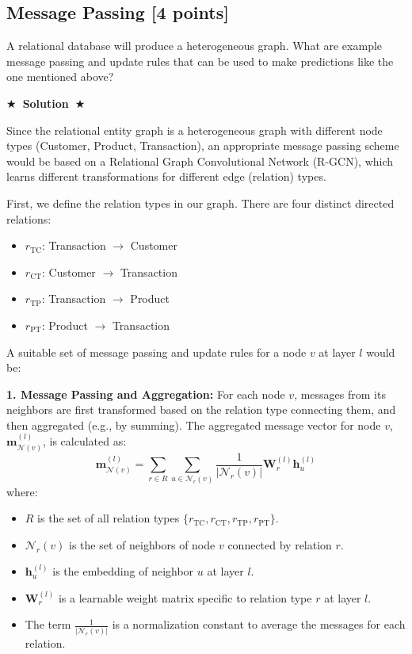 \documentclass{article}
\numberwithin{figure}{section}
\newcommand{\Solution}[1]{%
    {%
        \medskip
        \color{red}
        \bf $\bigstar$~\sf\textbf{Solution}~$\bigstar$ \sf
        #1
    }
    \bigskip
}
\begin{document}
\subsection{Message Passing [4 points]}
 A relational database will produce a heterogeneous graph. What are example message passing and update rules that can be used to make predictions like the one mentioned above?

\Solution{
	Since the relational entity graph is a heterogeneous graph with different node types (Customer, Product, Transaction), an appropriate message passing scheme would be based on a Relational Graph Convolutional Network (R-GCN), which learns different transformations for different edge (relation) types.
	
	First, we define the relation types in our graph. There are four distinct directed relations:
	\begin{itemize}
		\item $r_{\text{TC}}$: Transaction $\rightarrow$ Customer
		\item $r_{\text{CT}}$: Customer $\rightarrow$ Transaction
		\item $r_{\text{TP}}$: Transaction $\rightarrow$ Product
		\item $r_{\text{PT}}$: Product $\rightarrow$ Transaction
	\end{itemize}
	
	A suitable set of message passing and update rules for a node $v$ at layer $l$ would be:
	
	\textbf{1. Message Passing and Aggregation:}
	For each node $v$, messages from its neighbors are first transformed based on the relation type connecting them, and then aggregated (e.g., by summing). The aggregated message vector for node $v$, $\mathbf{m}_{\mathcal{N}(v)}^{(l)}$, is calculated as:
	\[ \mathbf{m}_{\mathcal{N}(v)}^{(l)} = \sum_{r \in R} \sum_{u \in \mathcal{N}_r(v)} \frac{1}{|\mathcal{N}_r(v)|} \mathbf{W}_r^{(l)} \mathbf{h}_u^{(l)} \]
	where:
	\begin{itemize}
		\item $R$ is the set of all relation types $\{r_{\text{TC}}, r_{\text{CT}}, r_{\text{TP}}, r_{\text{PT}}\}$.
		\item $\mathcal{N}_r(v)$ is the set of neighbors of node $v$ connected by relation $r$.
		\item $\mathbf{h}_u^{(l)}$ is the embedding of neighbor $u$ at layer $l$.
		\item $\mathbf{W}_r^{(l)}$ is a learnable weight matrix specific to relation type $r$ at layer $l$.
		\item The term $\frac{1}{|\mathcal{N}_r(v)|}$ is a normalization constant to average the messages for each relation.
	\end{itemize}
	
}
\end{document}
